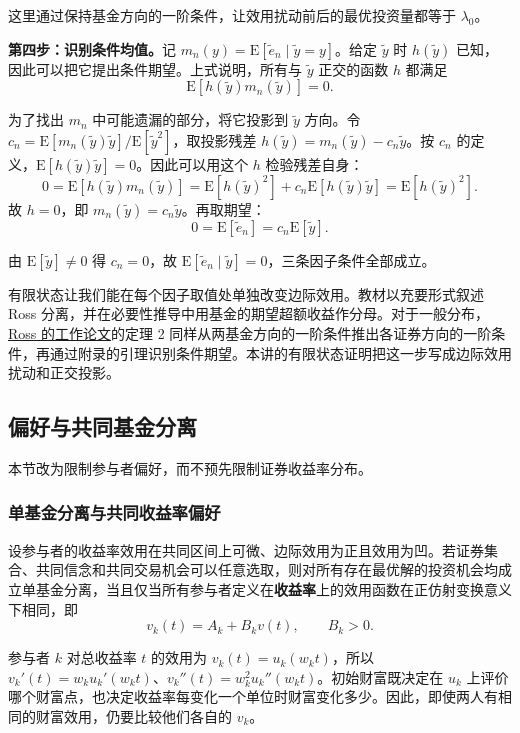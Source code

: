 \begin{solution}[label-content={证明},blank-type=none]
这里通过保持基金方向的一阶条件，让效用扰动前后的最优投资量都等于 $\lambda_0$。

\textbf{第四步：识别条件均值。}记 $m_n(y)=\mathrm E[\tilde e_n\mid\tilde y=y]$。给定 $\tilde y$ 时 $h(\tilde y)$ 已知，因此可以把它提出条件期望。上式说明，所有与 $\tilde y$ 正交的函数 $h$ 都满足
\[
 \mathrm E[h(\tilde y)m_n(\tilde y)]=0.
\]

为了找出 $m_n$ 中可能遗漏的部分，将它投影到 $\tilde y$ 方向。令 $c_n=\mathrm E[m_n(\tilde y)\tilde y]/\mathrm E[\tilde y^2]$，取投影残差 $h(\tilde y)=m_n(\tilde y)-c_n\tilde y$。按 $c_n$ 的定义，$\mathrm E[h(\tilde y)\tilde y]=0$。因此可以用这个 $h$ 检验残差自身：
\[
 0=\mathrm E[h(\tilde y)m_n(\tilde y)]
 =\mathrm E[h(\tilde y)^2]+c_n\mathrm E[h(\tilde y)\tilde y]
 =\mathrm E[h(\tilde y)^2].
\]
故 $h=0$，即 $m_n(\tilde y)=c_n\tilde y$。再取期望：
\[
 0=\mathrm E[\tilde e_n]=c_n\mathrm E[\tilde y].
\]

由 $\mathrm E[\tilde y]\ne0$ 得 $c_n=0$，故 $\mathrm E[\tilde e_n\mid\tilde y]=0$，三条因子条件全部成立。
\end{solution}
有限状态让我们能在每个因子取值处单独改变边际效用。教材以充要形式叙述 Ross 分离，并在必要性推导中用基金的期望超额收益作分母。对于一般分布，\href{https://rodneywhitecenter.wharton.upenn.edu/wp-content/uploads/2014/03/7601.pdf}{Ross 的工作论文}的定理 2 同样从两基金方向的一阶条件推出各证券方向的一阶条件，再通过附录的引理识别条件期望。本讲的有限状态证明把这一步写成边际效用扰动和正交投影。

\subsection{偏好与共同基金分离}
本节改为限制参与者偏好，而不预先限制证券收益率分布。
\subsubsection{单基金分离与共同收益率偏好}
\begin{tcolorbox}[knowledge]
 设参与者的收益率效用在共同区间上可微、边际效用为正且效用为凹。若证券集合、共同信念和共同交易机会可以任意选取，则对所有存在最优解的投资机会均成立单基金分离，当且仅当所有参与者定义在\textbf{收益率}上的效用函数在正仿射变换意义下相同，即
\[
 v_k(t)=A_k+B_kv(t),\qquad B_k>0.
\]
\end{tcolorbox}
参与者 $k$ 对总收益率 $t$ 的效用为 $v_k(t)=u_k(w_kt)$，所以 $v_k'(t)=w_ku_k'(w_kt)$、$v_k''(t)=w_k^2u_k''(w_kt)$。初始财富既决定在 $u_k$ 上评价哪个财富点，也决定收益率每变化一个单位时财富变化多少。因此，即使两人有相同的财富效用，仍要比较他们各自的 $v_k$。

